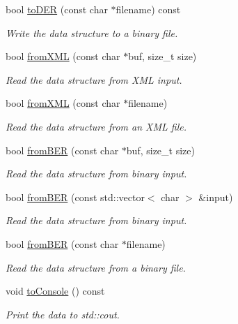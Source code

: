 \begin{DoxyCompactItemize}
bool \hyperlink{classASN1CContainer_ae3fa0fbad6b0375b36a73be41f2e8075}{to\+D\+ER} (const char $\ast$filename) const 
\begin{DoxyCompactList}\small\item\em Write the data structure to a binary file. \end{DoxyCompactList}\item 
bool \hyperlink{classASN1CContainer_aac98fb872b823dfaffce36a8bf24ddbe}{from\+X\+ML} (const char $\ast$buf, size\+\_\+t size)
\begin{DoxyCompactList}\small\item\em Read the data structure from X\+ML input. \end{DoxyCompactList}\item 
bool \hyperlink{classASN1CContainer_af43531162a367d3b79be39e90ec72ebb}{from\+X\+ML} (const char $\ast$filename)
\begin{DoxyCompactList}\small\item\em Read the data structure from an X\+ML file. \end{DoxyCompactList}\item 
bool \hyperlink{classASN1CContainer_a08fc60e1d78b99b33a19dba1f1c39900}{from\+B\+ER} (const char $\ast$buf, size\+\_\+t size)
\begin{DoxyCompactList}\small\item\em Read the data structure from binary input. \end{DoxyCompactList}\item 
bool \hyperlink{classASN1CContainer_afbeda1aa393679759574f17e34cedf06}{from\+B\+ER} (const std\+::vector$<$ char $>$ \&input)
\begin{DoxyCompactList}\small\item\em Read the data structure from binary input. \end{DoxyCompactList}\item 
bool \hyperlink{classASN1CContainer_a7465eb755c1031b3745796faa02781ad}{from\+B\+ER} (const char $\ast$filename)
\begin{DoxyCompactList}\small\item\em Read the data structure from a binary file. \end{DoxyCompactList}\item 
void \hyperlink{classASN1CContainer_acc5d252d15af64426472504f04f2b1e8}{to\+Console} () const \hypertarget{classASN1CContainer_acc5d252d15af64426472504f04f2b1e8}{}\label{classASN1CContainer_acc5d252d15af64426472504f04f2b1e8}

\begin{DoxyCompactList}\small\item\em Print the data to std\+::cout. \end{DoxyCompactList}\end{DoxyCompactItemize}
